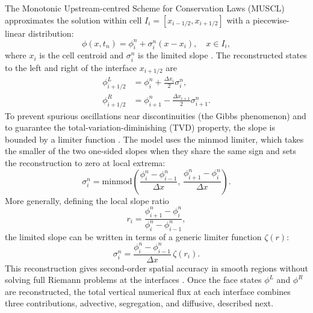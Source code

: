 \documentclass[lineno]{JFM-FLM_Au}
\begin{document}
The Monotonic Upstream-centred Scheme for Conservation Laws (MUSCL) \citep{vanLeer1979} approximates the solution within cell $I_i=[x_{i-1/2},x_{i+1/2}]$ with a piecewise-linear distribution:
\begin{equation}
    \phi(x,t_n) = \phi_i^{n} + \sigma_i^{n}(x-x_i), \quad x \in I_i,
    \label{eq:muscl_linear}
\end{equation}
where $x_i$ is the cell centroid and $\sigma_i^n$ is the limited slope \citep{toro2009}. The reconstructed states to the left and right of the interface $x_{i+1/2}$ are
\begin{align}
    \phi^{L}_{i+1/2} &= \phi_i^{n} + \frac{\Delta x_i}{2}\sigma_i^{n}, \label{eq:muscl_left}\\
    \phi^{R}_{i+1/2} &= \phi_{i+1}^{n} - \frac{\Delta x_{i+1}}{2}\sigma_{i+1}^{n}. \label{eq:muscl_right}
\end{align}
To prevent spurious oscillations near discontinuities (the Gibbs phenomenon) and to guarantee the total-variation-diminishing (TVD) property, the slope is bounded by a limiter function \citep{toro2009, nessyahutadmor1990}. The model uses the minmod limiter, which takes the smaller of the two one-sided slopes when they share the same sign and sets the reconstruction to zero at local extrema:
\begin{equation}
    \sigma_i^{n} = \mathrm{minmod}\!\left(\frac{\phi_i^{n}-\phi_{i-1}^{n}}{\Delta x},\, \frac{\phi_{i+1}^{n}-\phi_i^{n}}{\Delta x}\right).
    \label{eq:minmod}
\end{equation}
More generally, defining the local slope ratio
\begin{equation}
    r_i = \frac{\phi_{i+1}^{n}-\phi_i^{n}}{\phi_i^{n}-\phi_{i-1}^{n}},
    \label{eq:slope_ratio}
\end{equation}
the limited slope can be written in terms of a generic limiter function $\zeta(r)$:
\begin{equation}
    \sigma_i^{n} = \frac{\phi_i^{n}-\phi_{i-1}^{n}}{\Delta x}\, \zeta(r_i).
    \label{eq:limiter_generic}
\end{equation}
This reconstruction gives second-order spatial accuracy in smooth regions without solving full Riemann problems at the interfaces \citep{toro2009}. Once the face states $\phi^L$ and $\phi^R$ are reconstructed, the total vertical numerical flux at each interface combines three contributions, advective, segregation, and diffusive, described next.
\end{document}
